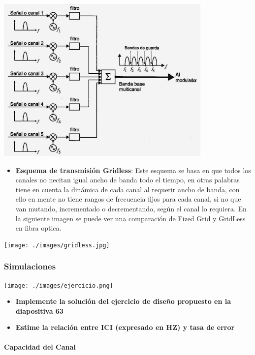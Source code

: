 \documentclass[11pt]{article}
\providecommand{\tightlist}{%
      \setlength{\itemsep}{0pt}\setlength{\parskip}{0pt}}
\begin{document}
\includegraphics{./images/FDM.png}

\begin{itemize}
\tightlist
\item
  \textbf{Esquema de transmisión Gridless}: Este esquema se basa en que
  todos los canales no necitan igual ancho de banda todo el tiempo, en
  otras palabras tiene en cuenta la dinámica de cada canal al requerir
  ancho de banda, con ello en mente no tiene rangos de frecuencia fijos
  para cada canal, si no que van mutando, incrementado o decrementando,
  según el canal lo requiera. En la siguiente imagen se puede ver una
  comparación de Fized Grid y GridLess en fibra optica.
\end{itemize}

\texttt{[image: ./images/gridless.jpg]}

    \hypertarget{simulaciones}{%
\subsubsection{Simulaciones}\label{simulaciones}}

\texttt{[image: ./images/ejercicio.png]}

\begin{itemize}
\tightlist
\item
  \textbf{Implemente la solución del ejercicio de diseño propuesto en la
  diapositiva 63}
\item
  \textbf{Estime la relación entre ICI (expresado en HZ) y tasa de
  error}
\end{itemize}

\hypertarget{capacidad-del-canal}{%
\paragraph{Capacidad del Canal}\label{capacidad-del-canal}}
\end{document}
